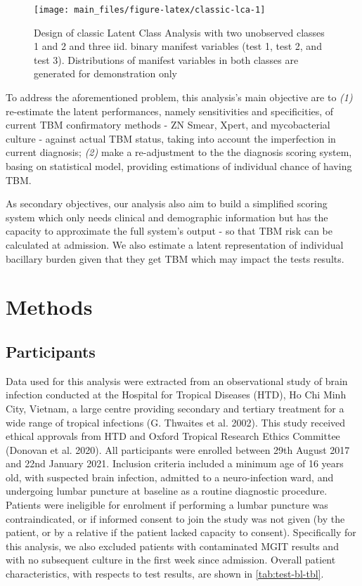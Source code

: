 \documentclass[
]{article}
\begin{document}
\begin{figure}

{\centering \texttt{[image: main\_files/figure-latex/classic-lca-1]} 

}

\caption{Design of classic Latent Class Analysis with two unobserved classes 1 and 2 and three iid. binary manifest variables (test 1, test 2, and test 3). Distributions of manifest variables in both classes are generated for demonstration only}\label{fig:classic-lca}
\end{figure}

To address the aforementioned problem, this analysis's main objective are to \emph{(1)} re-estimate the latent performances, namely sensitivities and specificities, of current TBM confirmatory methods - ZN Smear, Xpert, and mycobacterial culture - against actual TBM status, taking into account the imperfection in current diagnosis; \emph{(2)} make a re-adjustment to the the diagnosis scoring system, basing on statistical model, providing estimations of individual chance of having TBM.

As secondary objectives, our analysis also aim to build a simplified scoring system which only needs clinical and demographic information but has the capacity to approximate the full system's output - so that TBM risk can be calculated at admission. We also estimate a latent representation of individual bacillary burden given that they get TBM which may impact the tests results.

\hypertarget{methods}{%
\section{Methods}\label{methods}}

\hypertarget{participants}{%
\subsection{Participants}\label{participants}}

Data used for this analysis were extracted from an observational study of brain infection conducted at the Hospital for Tropical Diseases (HTD), Ho Chi Minh City, Vietnam, a large centre providing secondary and tertiary treatment for a wide range of tropical infections (G. Thwaites et al. 2002). This study received ethical approvals from HTD and Oxford Tropical Research Ethics Committee (Donovan et al. 2020). All participants were enrolled between 29th August 2017 and 22nd January 2021. Inclusion criteria included a minimum age of 16 years old, with suspected brain infection, admitted to a neuro-infection ward, and undergoing lumbar puncture at baseline as a routine diagnostic procedure. Patients were ineligible for enrolment if performing a lumbar puncture was contraindicated, or if informed consent to join the study was not given (by the patient, or by a relative if the patient lacked capacity to consent). Specifically for this analysis, we also excluded patients with contaminated MGIT results and with no subsequent culture in the first week since admission. Overall patient characteristics, with respects to test results, are shown in \ref{tab:test-bl-tbl}.
\end{document}
